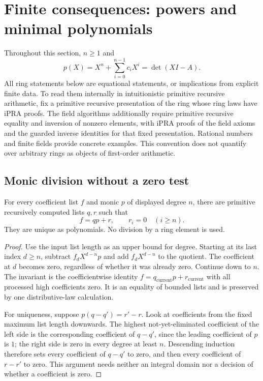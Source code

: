 
\section{Finite consequences: powers and minimal polynomials}
\label{sec:finite-applications}

Throughout this section, $n\geq1$ and
\[
 p(X)=X^n+\sum_{i=0}^{n-1}c_iX^i=\det(XI-A).
\]
All ring statements below are equational statements, or implications from
explicit finite data. To read them internally in intuitionistic primitive
recursive arithmetic, fix a primitive recursive presentation of the ring
whose ring laws have iPRA proofs. The field algorithms additionally require
primitive recursive equality and inversion of nonzero elements, with
iPRA proofs of the field axioms and the guarded inverse identities for
that fixed presentation. Rational
numbers and finite fields provide concrete examples. This convention does
not quantify over arbitrary rings as objects of first-order arithmetic.

\subsection{Monic division without a zero test}

\begin{lemma}
For every coefficient list $f$ and monic $p$ of displayed degree $n$, there
are primitive recursively computed lists $q,r$ such that
\[
 f=qp+r,\qquad r_i=0\quad(i\geq n).
\]
They are unique as polynomials. No division by a ring element is used.
\end{lemma}
\begin{proof}
Use the input list length as an upper bound for degree. Starting at its last
index $d\geq n$, subtract $f_dX^{d-n}p$ and add $f_dX^{d-n}$ to the quotient.
The coefficient at $d$ becomes zero, regardless of whether it was already
zero. Continue down to $n$. The invariant is the coefficientwise identity
$f=q_{\mathrm{current}}p+r_{\mathrm{current}}$ with all processed high
coefficients zero. It is an equality of bounded lists and is preserved by
one distributive-law calculation.

For uniqueness, suppose $p(q-q')=r'-r$. Look at coefficients from the fixed
maximum list length downwards. The highest not-yet-eliminated coefficient
of the left side is the corresponding coefficient of $q-q'$, since the
leading coefficient of $p$ is $1$; the right side is zero in every degree
at least $n$. Descending induction therefore sets every coefficient of
$q-q'$ to zero, and then every coefficient of $r-r'$ to zero. This argument
needs neither an integral domain nor a decision of whether a coefficient
is zero.
\end{proof}

